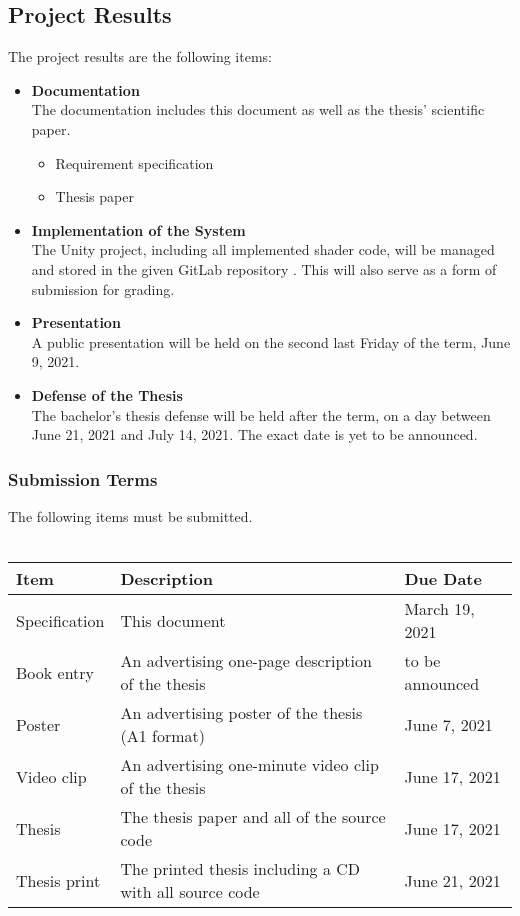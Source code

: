 \subsection{Project Results}
The project results are the following items:
\begin{itemize}
    \item \textbf{Documentation} \\
    The documentation includes this document as well as the thesis' scientific paper.
    \begin{itemize}
        \item Requirement specification
        \item Thesis paper
    \end{itemize}
    \item \textbf{Implementation of the System} \\
    The Unity project, including all implemented shader code, will be managed and stored in the given GitLab repository \cite{gitlab}. This will also serve as a form of submission for grading.
    \item \textbf{Presentation} \\
    A public presentation will be held on the second last Friday of the term, June 9, 2021.
    \item \textbf{Defense of the Thesis} \\
    The bachelor's thesis defense will be held after the term, on a day between June 21, 2021 and July 14, 2021. The exact date is yet to be announced. 
\end{itemize}

\subsubsection{Submission Terms}
The following items must be submitted.
\\\\
\noindent
\begin{tabular}{|l|l|l|}
    \hline
    \textbf{Item}    & \textbf{Description}                                      & \textbf{Due Date}     \\ \hline
    Specification    & This document                                             & March 19, 2021      \\ \hline
    Book entry       & An advertising one-page description of the thesis         & to be announced       \\ \hline
    Poster           & An advertising poster of the thesis (A1 format)           & June 7, 2021        \\ \hline
    Video clip       & An advertising one-minute video clip of the thesis        & June 17, 2021       \\ \hline
    Thesis           & The thesis paper and all of the source code               & June 17, 2021       \\ \hline
    Thesis print     & The printed thesis including a CD with all source code    & June 21, 2021       \\ \hline
\end{tabular}
\newline
\noindent